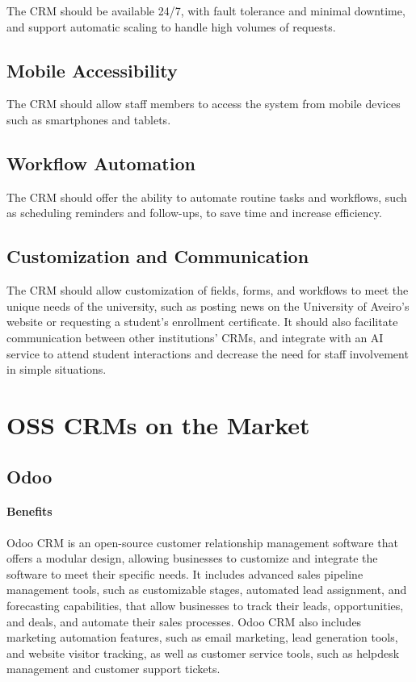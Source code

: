 \documentclass{article}
\begin{document}
The CRM should be available 24/7, with fault tolerance and minimal downtime, and support automatic scaling to handle high volumes of requests.

\subsection{Mobile Accessibility}

The CRM should allow staff members to access the system from mobile devices such as smartphones and tablets.

\subsection{Workflow Automation}

The CRM should offer the ability to automate routine tasks and workflows, such as scheduling reminders and follow-ups, to save time and increase efficiency.

\subsection{Customization and Communication}
The CRM should allow customization of fields, forms, and workflows to meet the unique needs of the university, such as posting news on the University of Aveiro's website or requesting a student's enrollment certificate. It should also facilitate communication between other institutions' CRMs, and integrate with an AI service to attend student interactions and decrease the need for staff involvement in simple situations.


\section{OSS CRMs on the Market}

\subsection{Odoo}

\paragraph{Benefits}

Odoo CRM is an open-source customer relationship management software that offers a modular design, allowing businesses to customize and integrate the software to meet their specific needs. It includes advanced sales pipeline management tools, such as customizable stages, automated lead assignment, and forecasting capabilities, that allow businesses to track their leads, opportunities, and deals, and automate their sales processes. Odoo CRM also includes marketing automation features, such as email marketing, lead generation tools, and website visitor tracking, as well as customer service tools, such as helpdesk management and customer support tickets.
\end{document}
